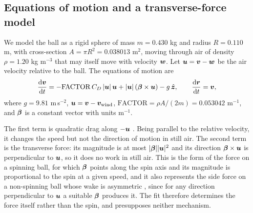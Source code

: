\subsection{Equations of motion and a transverse-force model}

We model the ball as a rigid sphere of mass $m=0.430$ kg and radius
$R=0.110$ m, with cross-section $A=\pi R^2=0.038013$ m$^2$, moving through air
of density $\rho=1.20$ kg m$^{-3}$ that may itself move with velocity $\bm{w}$.
Let $\bm{u}=\bm{v}-\bm{w}$ be the air velocity relative to the ball. The
equations of motion are
\begin{equation}
  \frac{\mathrm{d}\bm{v}}{\mathrm{d} t}
  =-\mathrm{FACTOR}\,C_D\,|\bm{u}|\,\bm{u}
  +|\bm{u}|\,(\bm{\beta}\times\bm{u})
  -g\,\hat{\bm{z}},
  \qquad
  \frac{\mathrm{d}\bm{r}}{\mathrm{d} t}=\bm{v},
  \label{eq:eom}
\end{equation}
where $g=9.81$ m\,s$^{-2}$, $\bm{u}=\bm{v}-\bm{v}_{\rm wind}$,
$\mathrm{FACTOR}=\rho A/(2m)=0.053042$ m$^{-1}$, and $\bm{\beta}$ is a
constant vector with units m$^{-1}$.

The first term is quadratic drag along $-\bm{u}$ \citep{mehta1985,nathan2008}.
Being parallel to the relative velocity, it changes the speed but not the
direction of motion in still air. The second term is the transverse force: its
magnitude is at most $|\bm{\beta}||\bm{u}|^2$ and its direction
$\bm{\beta}\times\bm{u}$ is perpendicular to $\bm{u}$, so it does no work in
still air. This is the form of the force on a spinning ball, for which
$\bm{\beta}$ points along the spin axis and its magnitude is proportional to the
spin at a given speed, and it also represents the side force on a non-spinning
ball whose wake is
asymmetric \citep{texier2016}, since for any direction perpendicular to $\bm{u}$
a suitable $\bm{\beta}$ produces it. The fit therefore determines the force
itself rather than the spin, and presupposes neither mechanism.


